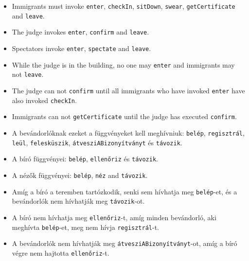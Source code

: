 \documentclass{book}
\begin{document}
\begin{itemize}

\item Immigrants must invoke {\tt enter}, {\tt checkIn}, {\tt sitDown},
{\tt swear}, {\tt getCertificate} and {\tt leave}.

\item The judge invokes {\tt enter}, {\tt confirm} and {\tt leave}.

\item Spectators invoke {\tt enter}, {\tt spectate} and {\tt leave}.

\item While the judge is in the building, no one may {\tt enter}
and immigrants may not {\tt leave}.

\item The judge can not {\tt confirm} until all immigrants who have
invoked {\tt enter} have also invoked {\tt checkIn}.

\item Immigrants can not {\tt getCertificate} until the judge
has executed {\tt confirm}.

\end{itemize}

\begin{itemize}

\item A bevándorlóknak ezeket a függvényeket kell meghívniuk:
{\tt belép}, {\tt regisztrál}, {\tt leül},
{\tt felesküszik}, {\tt átvesziABizonyítványt} és {\tt távozik}.

\item A bíró függvényei: {\tt belép}, {\tt ellenőriz} és {\tt távozik}.

\item A nézők függvényei: {\tt belép}, {\tt néz} and {\tt távozik}.

\item Amíg a bíró a teremben tartózkodik, senki sem hívhatja meg {\tt belép}-et,
és a bevándorlók nem hívhatják meg {\tt távozik}-ot.

\item A bíró nem hívhatja meg {\tt ellenőriz}-t, amíg minden bevándorló,
aki meghívta {\tt belép}-et, meg nem hívja {\tt regisztrál}-t.

\item A bevándorlók nem hívhatják meg {\tt átvesziABizonyítványt}-ot,
amíg a bíró végre nem hajtotta {\tt ellenőriz}-t.

\end{itemize}
\end{document}
